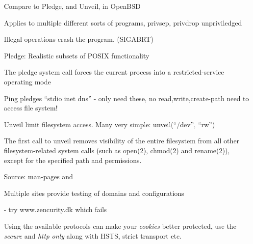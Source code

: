 \documentclass[Screen16to9,17pt]{foils}
\begin{document}
Compare to Pledge, and Unveil, in OpenBSD
\begin{list2}
\item Applies to multiple different sorts of programs, privsep, privdrop
unpriviledged
\item Illegal operations crash the program. (SIGABRT)
\item Pledge: Realistic subsets of POSIX functionality
\item The pledge system call forces the current process into a restricted-service operating mode\\
\item Ping pledges “stdio inet dns” - only need these, no read,write,create-path need to access file system!
\item Unveil limit filesystem access. Many very simple: unveil(“/dev”, “rw”)
\item The first call to unveil removes visibility of the entire filesystem from all other filesystem-related system calls (such as open(2), chmod(2) and rename(2)), except for the specified path and permissions.\\ 
\end{list2}

Source: man-pages and\\ 






\begin{list1}
\item Multiple sites provide testing of domains and configurations
\item {}
\item {}
\item {} - try www.zencurity.dk which fails
\item {}
\item {}
\item {}
\item Using the available protocols can make your \emph{cookies} better protected, use the \emph{secure} and \emph{http only} along with HSTS, strict transport etc.
\end{list1}
\end{document}
